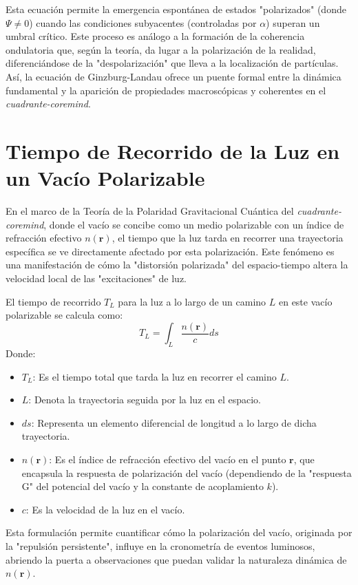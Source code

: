 \documentclass{book}
\begin{document}
Esta ecuación permite la emergencia espontánea de estados "polarizados" (donde $\Psi \neq 0$) cuando las condiciones subyacentes (controladas por $\alpha$) superan un umbral crítico. Este proceso es análogo a la formación de la coherencia ondulatoria que, según la teoría, da lugar a la polarización de la realidad, diferenciándose de la "despolarización" que lleva a la localización de partículas. Así, la ecuación de Ginzburg-Landau ofrece un puente formal entre la dinámica fundamental y la aparición de propiedades macroscópicas y coherentes en el \textit{cuadrante-coremind}.

\section*{Tiempo de Recorrido de la Luz en un Vacío Polarizable}
\label{sec:light_travel_time}

En el marco de la Teoría de la Polaridad Gravitacional Cuántica del \textit{cuadrante-coremind}, donde el vacío se concibe como un medio polarizable con un índice de refracción efectivo $n(\mathbf{r})$, el tiempo que la luz tarda en recorrer una trayectoria específica se ve directamente afectado por esta polarización. Este fenómeno es una manifestación de cómo la "distorsión polarizada" del espacio-tiempo altera la velocidad local de las "excitaciones" de luz.

El tiempo de recorrido $T_L$ para la luz a lo largo de un camino $L$ en este vacío polarizable se calcula como:
\begin{equation}
    T_L = \int_{L} \frac{n(\mathbf{r})}{c} ds
    \label{eq:light_travel_time}
\end{equation}
Donde:
\begin{itemize}
    \item $T_L$: Es el tiempo total que tarda la luz en recorrer el camino $L$.
    \item $L$: Denota la trayectoria seguida por la luz en el espacio.
    \item $ds$: Representa un elemento diferencial de longitud a lo largo de dicha trayectoria.
    \item $n(\mathbf{r})$: Es el índice de refracción efectivo del vacío en el punto $\mathbf{r}$, que encapsula la respuesta de polarización del vacío (dependiendo de la "respuesta G" del potencial del vacío y la constante de acoplamiento $k$).
    \item $c$: Es la velocidad de la luz en el vacío.
\end{itemize}
Esta formulación permite cuantificar cómo la polarización del vacío, originada por la "repulsión persistente", influye en la cronometría de eventos luminosos, abriendo la puerta a observaciones que puedan validar la naturaleza dinámica de $n(\mathbf{r})$.

\end{document}
